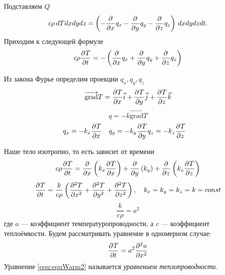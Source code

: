 Подставляем $Q$
\[
	c \rho \, dT dx dy dz = \left(-\frac{\partial^{}}{\partial x^{}} q_x - \frac{\partial^{}}{\partial y^{}} q_y - \frac{\partial^{}}{\partial z^{}} q_z \right)\, dx dy dz  dt.
\]
Приходим к следующей формуле
\[
	c \rho \frac{\partial^{}T}{\partial t^{}} = - \left(\frac{\partial^{}}{\partial x^{}}q_x + \frac{\partial^{}}{\partial y^{}} q_y + \frac{\partial^{}}{\partial z^{}} q_z \right)
\]

Из закона Фурье определим проекции $q_x, q_y, q_z$
\[
	\overrightarrow{\mathrm{grad}} T = \frac{\partial^{}T}{\partial x^{}} \vec i + \frac{\partial^{}T}{\partial y^{}} \vec j + \frac{\partial^{}T}{\partial z^{}} \vec k
\]
\[
	q = - k \overrightarrow{\mathrm{grad}} T
\]
\begin{align*}
	&q_x = - k_x \frac{\partial^{}T}{\partial x^{}} &q_y = - k_y \frac{\partial^{}T}{\partial y^{}} &q_z = - k_z \frac{\partial^{}T}{\partial z^{}}
\end{align*}


Наше тело изотропно, то есть зависит от времени
\[
	c \rho \frac{\partial^{}T}{\partial t^{}} = \frac{\partial^{}}{\partial x^{}} \left(k_x \frac{\partial^{}T}{\partial x^{}} \right) + \frac{\partial^{}}{\partial y^{}} \left(k_y \right) + \frac{\partial^{}}{\partial z^{}} \left(k_z \frac{\partial^{}T}{\partial z^{}} \right)
\]
\[
	\frac{\partial^{}T}{\partial t^{}} = \frac{k}{c \rho} \left( \frac{\partial^{2}T}{\partial x^{2}} + \frac{\partial^{2}T}{\partial y^{2}} + \frac{\partial^{2}T}{\partial z^{2}} \right), \quad k_x = k_y = k_z = k = const
\]
\[
	\frac{k}{c \rho} = a^2
\]
где $a$ --- коэффициент температуропроводности, а $c$ --- коэффициент теплоёмкости.
Будем рассматривать уравнение в одномерном случае:
\begin{equation}
	\frac{\partial^{}T}{\partial t^{}} = a^2\frac{\partial^{2}u}{\partial x^{2}}
	\label{equ:equWarm2}
\end{equation}
	Уравнение \eqref{equ:equWarm2} называется \textit{уравнением теплопроводности}.
